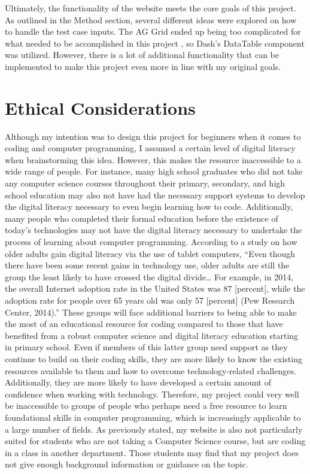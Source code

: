 \documentclass[10pt,twocolumn]{article}
\begin{document}
Ultimately, the functionality of the website meets the core goals of this project. As outlined in the Method section, several different ideas were explored on how to handle the test case inputs. The AG Grid ended up being too complicated for what needed to be accomplished in this project \cite{AG}, so Dash's DataTable component was utilized. However, there is a lot of additional functionality that can be implemented to make this project even more in line with my original goals. 

\section{Ethical Considerations}

Although my intention was to design this project for beginners when it comes to coding and computer programming, I assumed a certain level of digital literacy when brainstorming this idea. However, this makes the resource inaccessible to a wide range of people. For instance, many high school graduates who did not take any computer science courses throughout their primary, secondary, and high school education may also not have had the necessary support systems to develop the digital literacy necessary to even begin learning how to code. Additionally, many people who completed their formal education before the existence of today’s technologies may not have the digital literacy necessary to undertake the process of learning about computer programming. According to a study on how older adults gain digital literacy via the use of tablet computers, “Even though there have been some recent gains in technology use, older adults are still the group the least likely to have crossed the digital divide… For example, in 2014, the overall Internet adoption rate in the United States was 87 [percent], while the adoption rate for people over 65 years old was only 57 [percent] (Pew Research Center, 2014).”\cite{Adults} These groups will face additional barriers to being able to make the most of an educational resource for coding compared to those that have benefited from a robust computer science and digital literacy education starting in primary school. Even if members of this latter group need support as they continue to build on their coding skills, they are more likely to know the existing resources available to them and how to overcome technology-related challenges. Additionally, they are more likely to have developed a certain amount of confidence when working with technology. Therefore, my project could very well be inaccessible to groups of people who perhaps need a free resource to learn foundational skills in computer programming, which is increasingly applicable to a large number of fields. As previously stated, my website is also not particularly suited for students who are not taking a Computer Science course, but are coding in a class in another department. Those students may find that my project does not give enough background information or guidance on the topic. 
\end{document}
